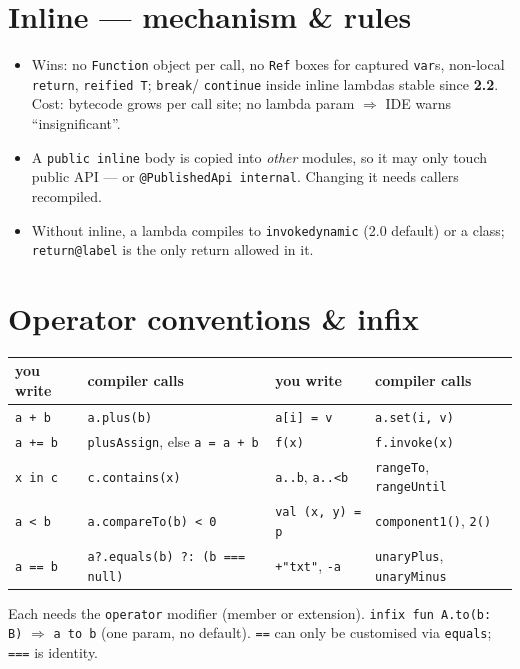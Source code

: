 \documentclass[8pt]{extarticle}
\newcommand\pleq{\texttt{\hbox{+}\hbox{=}}}
\newcommand\eqeq{\texttt{\hbox{=}\hbox{=}}}
\newcommand\dd{\texttt{\hbox{.}\hbox{.}}}
\newcommand\ddl{\texttt{\hbox{.}\hbox{.}\hbox{<}}}
\newcommand\sq{\texttt{\hbox{?}\hbox{.}}}
\newcommand\elv{\texttt{\hbox{?}\hbox{:}}}
\newcommand\eqeqeq{\texttt{\hbox{=}\hbox{=}\hbox{=}}}
\begin{document}
\begin{multicols}{2}
\raggedright

\section{Inline — mechanism \& rules}
\begin{itemize}\raggedright
  \item Wins: no \texttt{Function} object per call, no \texttt{Ref} boxes for captured
        \texttt{var}s, non-local \texttt{return}, \texttt{reified T}; \texttt{break}/
        \texttt{continue} inside inline lambdas stable since \textbf{2.2}. Cost: bytecode grows
        per call site; no lambda param $\Rightarrow$ IDE warns ``insignificant''.
  \item A \texttt{public inline} body is copied into \emph{other} modules, so it may only touch
        public API — or \texttt{@PublishedApi internal}. Changing it needs callers recompiled.
  \item Without inline, a lambda compiles to \texttt{invokedynamic} (2.0 default) or a class;
        \texttt{return@label} is the only return allowed in it.
\end{itemize}

\section{Operator conventions \& infix}
{\scriptsize
\noindent\begin{tabularx}{\linewidth}{@{}>{\raggedright\arraybackslash}p{17mm}L>{\raggedright\arraybackslash}p{15mm}L@{}}
\toprule
\textbf{you write} & \textbf{compiler calls} & \textbf{you write} & \textbf{compiler calls} \\
\midrule
\texttt{a + b} & \texttt{a.plus(b)} & \texttt{a[i] = v} & \texttt{a.set(i, v)} \\
\texttt{a \pleq{} b} & \texttt{plusAssign}, else \texttt{a = a + b} & \texttt{f(x)} & \texttt{f.invoke(x)} \\
\texttt{x in c} & \texttt{c.contains(x)} & \texttt{a\dd{}b}, \texttt{a\ddl{}b} & \texttt{rangeTo}, \texttt{rangeUntil} \\
\texttt{a < b} & \texttt{a.compareTo(b) < 0} & \texttt{val (x, y) = p} & \texttt{component1()}, \texttt{2()} \\
\texttt{a \eqeq{} b} & \texttt{a}\sq\texttt{equals(b) }\elv\texttt{ (b }\eqeqeq\texttt{ null)} & \texttt{+"txt"}, \texttt{-a} & \texttt{unaryPlus}, \texttt{unaryMinus} \\
\bottomrule
\end{tabularx}}
{\raggedright Each needs the \texttt{operator} modifier (member or extension).
\texttt{infix fun A.to(b: B)} $\Rightarrow$ \texttt{a to b} (one param, no default). \eqeq{}
can only be customised via \texttt{equals}; \eqeqeq{} is identity.\par}


\end{multicols}
\end{document}
